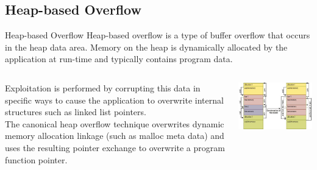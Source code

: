 \subsection{Heap-based Overflow}
\begin{frame}{Heap-based Overflow}
	Heap-based overflow is a type of buffer overflow that occurs in the heap data area. Memory on the heap is dynamically allocated by the application at run-time and typically contains program data.\\
\begin{columns}[T]
	\begin{column}{.47\textwidth}
		Exploitation is performed by corrupting this data in specific ways to cause the application to overwrite internal structures such as linked list pointers.\\
		The canonical heap overflow technique overwrites dynamic memory allocation linkage (such as malloc meta data) and uses the resulting pointer exchange to overwrite a program function pointer.
	\end{column}
	\begin{column}{.5\textwidth}
		\includegraphics[width=\textwidth]{imgs/heap.png}
		\label{fig:heap}
	\end{column}
\end{columns}
\end{frame}


